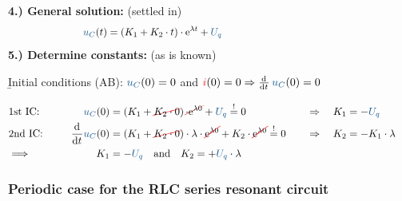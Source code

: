 \begin{frame}\ftx{\subsubsecname}%
    \textbf{4.) General solution:} (settled in)%
    \begin{align}
        &&
            \ecv{u_C}(t) &= \left( K_1 + K_2 \cdot t \right) \cdot \mathrm{e}^{\lambda t} + \ecv{U_q} \nonumber\\[-14pt]
        &\hphantom{1Rooooooo}&\hphantom{2Loooooo}&\hphantom{2Roooooooooooooooooooooooooooooooooo}&\hphantom{3Loooooo}&\hphantom{3Roooooooooo} \nonumber %
    \end{align}
    \textbf{5.) Determine constants:} (as is known)

    \b{\vspace{4pt}Initial conditions (AB): $\ecv{u_C}(0)=0$ and $\eci{i}(0)=0 \Rightarrow \dt\, \ecv{u_C}(0) = 0 $}

    \begin{align*}
        &\hphantom{1Rooooooo}&\hphantom{2Loooooo}&\hphantom{2Roooooooooooooooooooooooooooooooooo}&\hphantom{3Loooooo}&\hphantom{3Roooooooooo}\\[-15pt] %
        &\text{1st IC:}&
            \ecv{u_C}(0) &= \left( K_1 + \redcancel{K_2 \cdot 0 }\right) \redcancel{\cdot \mathrm{e}^{\lambda 0}} + \ecv{U_q} \overset{!}{=} 0 & \Rightarrow\quad K_1 &= -\ecv{U_q}\\
        &\text{2nd IC:}&
            \dt \ecv{u_C}(0) &= \left( K_1 + \redcancel{K_2 \cdot 0} \right) \cdot \lambda \cdot \redcancel{\mathrm{e}^{\lambda 0}} + K_2 \cdot \redcancel{\mathrm{e}^{\lambda 0}} \overset{!}{=} 0 & \Rightarrow\quad K_2 &= -K_1 \cdot \lambda \nonumber\\
            &\Longrightarrow&
        K_1 &= -\ecv{U_q} \quad\text{and}\quad
                K_2 = +\ecv{U_q} \cdot \lambda
    \end{align*}%
\end{frame}


\subsubsection[Periodischer Fall]{Periodic case for the RLC series resonant circuit}
\label{sec:schaltvorgaengezeitbereich:rlc:periodisch}

